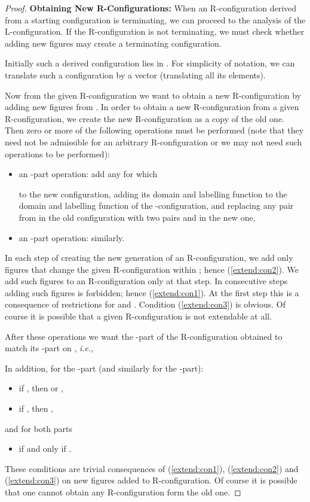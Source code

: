\documentclass[final,nomarks]{dmtcs-episciences}
\begin{document}
\begin{proof}
\textbf{Obtaining New R-Configurations:}
When an R-configuration derived from a starting configuration is terminating, we can proceed 
to the analysis of the L-configuration. If the R-configuration is not terminating, we must check 
whether adding new figures may create a terminating configuration.

Initially such a derived configuration lies in . For simplicity of notation, we can 
translate such a configuration by a vector  (translating all its elements).


Now from the given R-configuration we want to obtain a new
R-configuration by adding new figures from . In order to
obtain a new R-configuration from a given R-configuration, we
create the new R-configuration as a copy of the old one. Then
zero or more of the following operations must be performed (note
that they need not be admissible for an arbitrary
R-configuration or we may not need such operations to be
performed):
\begin{itemize}
 \item an -part operation:
   add any  for which
   
	  to the new configuration, adding its domain and labelling function to the domain and 
	  labelling function of the -configuration,
	  and replacing any pair  from  in the old configuration with 
	  two pairs  and 
	  in the new one,
 \item an -part operation: similarly.
\end{itemize}
In each step of creating the new generation of an R-configuration, we add only figures that 
change the given R-configuration
within ; hence (\ref{extend:con2}). We add such figures to an R-configuration only at 
that step. In consecutive steps adding such figures is forbidden; hence (\ref{extend:con1}). At 
the first step this is a consequence
of restrictions for  and . Condition (\ref{extend:con3}) is obvious. Of course it 
is possible that a given R-configuration is not extendable at all.

After these operations we want the -part of the R-configuration obtained to match its 
-part on , \textit{i.e.},

In addition, for the -part (and similarly for the -part):
\begin{itemize}
 \item if ,
 then  or ,
 \item if ,
 then ,
\end{itemize}
and for both parts
\begin{itemize}
 \item  if and only if .
\end{itemize}
These conditions are trivial consequences of
(\ref{extend:con1}), (\ref{extend:con2}) and (\ref{extend:con3})
on new figures added to R-configuration. Of course it is
possible that one cannot obtain any R-configuration form the old
one.


\end{proof}
\end{document}

